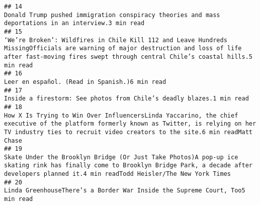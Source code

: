\documentclass[
]{article}
\begin{document}
\begin{verbatim}
## 14                                                                                                                                                                                                                                                                                                                  Donald Trump pushed immigration conspiracy theories and mass deportations in an interview.3 min read
## 15                                                                                                                                                                                                      ‘We’re Broken’: Wildfires in Chile Kill 112 and Leave Hundreds MissingOfficials are warning of major destruction and loss of life after fast-moving fires swept through central Chile’s coastal hills.5 min read
## 16                                                                                                                                                                                                                                                                                                                                                                         Leer en español. (Read in Spanish.)6 min read
## 17                                                                                                                                                                                                                                                                                                                                                  Inside a firestorm: See photos from Chile’s deadly blazes.1 min read
## 18                                                                                                                                                                                                  How X Is Trying to Win Over InfluencersLinda Yaccarino, the chief executive of the platform formerly known as Twitter, is relying on her TV industry ties to recruit video creators to the site.6 min readMatt Chase
## 19                                                                                                                                                                                                               Skate Under the Brooklyn Bridge (Or Just Take Photos)A pop-up ice skating rink has finally come to Brooklyn Bridge Park, a decade after developers planned it.4 min readTodd Heisler/The New York Times
## 20                                                                                                                                                                                                                                                                                                                                          Linda GreenhouseThere’s a Border War Inside the Supreme Court, Too5 min read

\end{verbatim}
\end{document}

